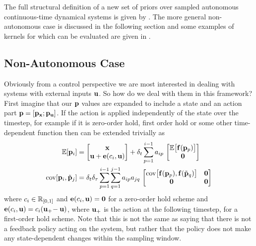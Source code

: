 The full structural definition of a new set of priors over sampled autonomous continuous-time dynamical systems is given by . The more general non-autonomous case is discussed in the following section and some examples of kernels for which  can be evaluated are given in .














\subsection{Non-Autonomous Case} \label{sec:nonaut}
Obviously from a control perspective we are most interested in dealing with systems with external inputs $\mathbf{u}$. So how do we deal with them in this framework? First imagine that our $\mathbf{p}$ values are expanded to include a state and an action part $\mathbf{p} = [\mathbf{p}_{\mathbf{x}}; \mathbf{p}_{\mathbf{u}}]$. If the action is applied independently of the state over the timestep, for example if it is zero-order hold, first order hold or some other time-dependent function then  can be extended trivially as
\begin{align}
\mathbb{E}[\mathbf{p}_i] &= \begin{bmatrix}  \mathbf{x} \\ \mathbf{u} + \mathbf{e}(c_i, \mathbf{u})  \end{bmatrix} + \delta_t \sum_{p=1}^{i-1} a_{ip}\, 
\begin{bmatrix}  \mathbb{E}\big[\mathbf{f}(\mathbf{p}_p)\big] \\ \mathbf{0}  \end{bmatrix} 
\label{eqn:nonaut1} \\
\mathrm{cov}[\mathbf{p}_i, \tilde{\mathbf{p}}_j] &= \delta_t \delta_{\tau} \sum_{p=1}^{i-1} \sum_{q=1}^{j-1} a_{ip} a_{jq}\,
\begin{bmatrix}  \mathrm{cov}\big[\mathbf{f}(\mathbf{p}_p), \mathbf{f}(\tilde{\mathbf{p}}_q)\big] & \mathbf{0} \\ \mathbf{0} & \mathbf{0}  \end{bmatrix}
\label{eqn:nonaut2}
\end{align}
where $c_i \in \mathbb{R}_{[0,1]}$ and $\mathbf{e}(c_i, \mathbf{u}) = \mathbf{0}$ for a zero-order hold scheme and $\mathbf{e}(c_i, \mathbf{u}) = c_i(\mathbf{u}_+ \! - \mathbf{u})$, where $\mathbf{u}_+$ is the action at the following timestep, for a first-order hold scheme. Note that this is not the same as saying that there is not a feedback policy acting on the system, but rather that the policy does not make any state-dependent changes within the sampling window.

